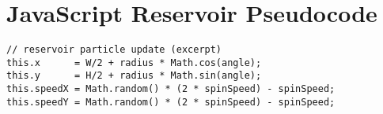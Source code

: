 \documentclass[12pt]{article}
\begin{document}

\section{JavaScript Reservoir Pseudocode}\label{app:pseudocode}
\begin{verbatim}
// reservoir particle update (excerpt)
this.x      = W/2 + radius * Math.cos(angle);
this.y      = H/2 + radius * Math.sin(angle);
this.speedX = Math.random() * (2 * spinSpeed) - spinSpeed;
this.speedY = Math.random() * (2 * spinSpeed) - spinSpeed;
\end{verbatim}
\end{document}
